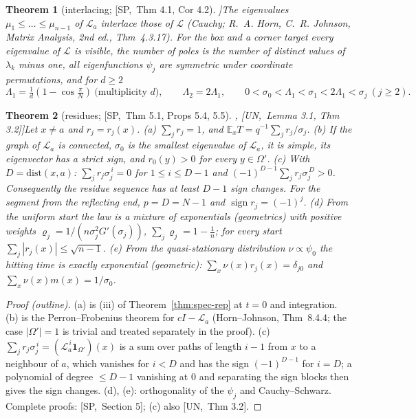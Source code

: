 \documentclass[10pt,a4paper]{article}
\theoremstyle{plain}
\newtheorem{theorem}{Theorem}[section]
\theoremstyle{definition}
\newcommand{\src}[2]{[\textsf{#1},~#2]}           %
\newcommand{\SPE}{\textsf{SP}}
\newcommand{\UNI}{\textsf{UN}}
\newcommand{\E}{\mathbb{E}}
\newcommand{\Lg}{\mathcal{L}}
\newcommand{\sgn}{\operatorname{sign}}
\begin{document}
\begin{theorem}[interlacing; \src{\SPE}{Thm 4.1, Cor 4.2}]\label{thm:interlacing}
The eigenvalues $\mu_1\le\dots\le\mu_{n-1}$ of $\Lg_a$ interlace those of $\Lg$ (Cauchy; R.~A. Horn, C.~R. Johnson, \emph{Matrix Analysis}, 2nd ed., Thm~4.3.17). For the box and a corner target every eigenvalue of $\Lg$ is visible, the number of poles is the number of distinct values of $\lambda_k$ minus one, all eigenfunctions $\psi_j$ are symmetric under coordinate permutations, and for $d\ge2$
\[
\Lambda_1=\tfrac1d(1-\cos\tfrac\pi N)\ \text{(multiplicity $d$)},\qquad \Lambda_2=2\Lambda_1,\qquad 0<\sigma_0<\Lambda_1<\sigma_1<2\Lambda_1<\sigma_j\ (j\ge2).
\]
\end{theorem}

\begin{theorem}[residues; \src{\SPE}{Thm 5.1, Props 5.4, 5.5}, \src{\UNI}{Lemma 3.1, Thm 3.2}]\label{thm:residues}
Let $x\ne a$ and $r_j=r_j(x)$.
(a) $\sum_jr_j=1$, and $\E_xT=q^{-1}\sum_jr_j/\sigma_j$.
(b) If the graph of $\Lg_a$ is connected, $\sigma_0$ is the smallest eigenvalue of $\Lg_a$, it is simple, its eigenvector has a strict sign, and $r_0(y)>0$ for every $y\in\Omega'$.
(c) With $D=\mathrm{dist}(x,a)$: $\sum_jr_j\sigma_j^{\,i}=0$ for $1\le i\le D-1$ and $(-1)^{D-1}\sum_jr_j\sigma_j^{\,D}>0$. Consequently the residue sequence has at least $D-1$ sign changes. For the segment from the reflecting end, $p=D=N-1$ and $\sgn r_j=(-1)^j$.
(d) From the uniform start the law is a mixture of exponentials (geometrics) with positive weights $\varrho_j=1/(n\sigma_j^2G'(\sigma_j))$, $\sum_j\varrho_j=1-\frac1n$; for every start $\sum_j|r_j(x)|\le\sqrt{n-1}$.
(e) From the quasi-stationary distribution $\nu\propto\psi_0$ the hitting time is exactly exponential (geometric): $\sum_x\nu(x)r_j(x)=\delta_{j0}$ and $\sum_x\nu(x)m(x)=1/\sigma_0$.
\end{theorem}
\begin{proof}[Proof (outline)]
(a) is (iii) of Theorem~\ref{thm:spec-rep} at $t=0$ and integration. (b) is the Perron--Frobenius theorem for $cI-\Lg_a$ (Horn--Johnson, Thm~8.4.4; the case $|\Omega'|=1$ is trivial and treated separately in the proof). (c) $\sum_jr_j\sigma_j^{\,i}=(\Lg_a^{\,i}\mathbf 1_{\Omega'})(x)$ is a sum over paths of length $i-1$ from $x$ to a neighbour of $a$, which vanishes for $i<D$ and has the sign $(-1)^{D-1}$ for $i=D$; a polynomial of degree $\le D-1$ vanishing at $0$ and separating the sign blocks then gives the sign changes. (d), (e): orthogonality of the $\psi_j$ and Cauchy--Schwarz. Complete proofs: \src{\SPE}{Section 5}; (c) also \src{\UNI}{Thm 3.2}.
\end{proof}
\end{document}
